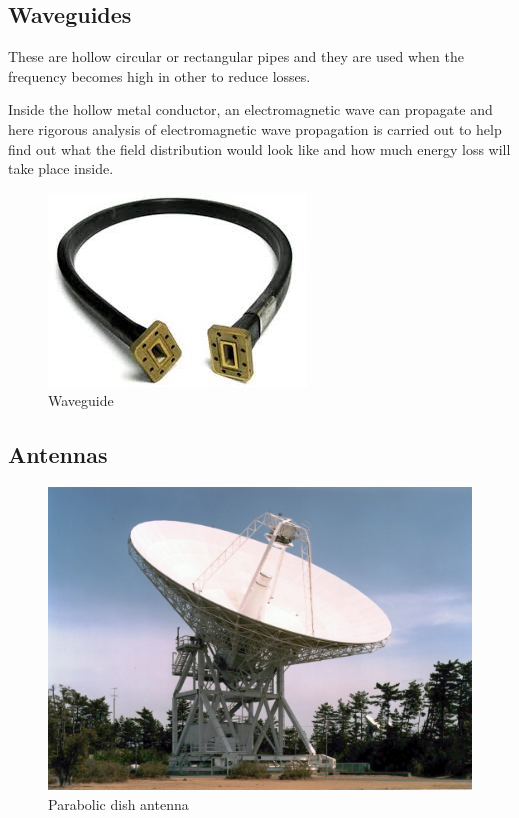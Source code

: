 \subsection{Waveguides}
These are hollow circular or rectangular pipes and they are used when the frequency becomes high in other to reduce losses. 

Inside the hollow metal conductor, an electromagnetic wave can propagate and here rigorous analysis of electromagnetic wave propagation is carried out to help find out what the field distribution would look like and how much energy loss will take place inside.
\begin{figure}[h]
\centering
\includegraphics[scale=0.5]{./graphics/waveguide2}
\caption{Waveguide}
\end{figure}

\subsection{Antennas}
\begin{figure}[h]
\centering
\includegraphics[scale=0.4]{./graphics/spcaceantenna}
\caption{Parabolic dish antenna}
\label{fig:spaceantenna}
\end{figure}

